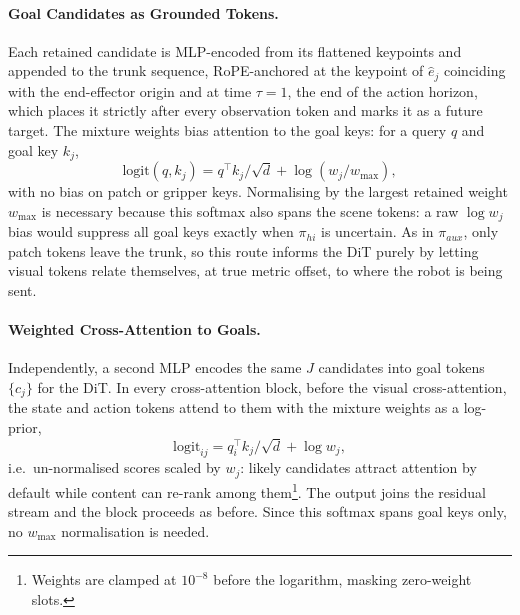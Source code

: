 \documentclass[letterpaper, 10 pt, conference]{ieeeconf}  %
\begin{document}
\paragraph{\textbf{Goal Candidates as Grounded Tokens.}}
Each retained candidate is MLP-encoded from its flattened keypoints and
appended to the trunk sequence, RoPE-anchored at the keypoint of $\hat{e}_j$
coinciding with the end-effector origin and at time $\tau=1$, the end of the
action horizon, which places it strictly after every observation token and
marks it as a future target. The mixture weights bias attention to the goal keys: for a
query $q$ and goal key $k_j$,
\begin{equation}
  \mathrm{logit}(q,k_j) = q^{\top}k_j/\sqrt{d} + \log(w_j/w_{\max}),
\end{equation}
with no bias on patch or gripper keys. Normalising by the largest retained
weight $w_{\max}$ is necessary because this softmax also spans the scene
tokens: a raw $\log w_j$ bias would suppress all goal keys exactly when
$\pi_{hi}$ is uncertain. As in $\pi_{aux}$, only patch tokens leave the trunk,
so this route informs the DiT purely by letting visual tokens relate
themselves, at true metric offset, to where the robot is being sent.

\paragraph{\textbf{Weighted Cross-Attention to Goals.}}
Independently, a second MLP encodes the same $J$ candidates into goal tokens
$\{c_j\}$ for the DiT. In every cross-attention block, before the visual
cross-attention, the state and action tokens attend to them with the mixture
weights as a log-prior,
\begin{equation}
  \mathrm{logit}_{ij} = q_i^{\top}k_j/\sqrt{d} + \log w_j,
\end{equation}
i.e.\ un-normalised scores scaled by $w_j$: likely candidates attract
attention by default while content can re-rank among
them\footnote{Weights are clamped at $10^{-8}$ before the logarithm, masking
zero-weight slots.}. The output joins the residual stream and the block
proceeds as before. Since this softmax spans goal keys only, no $w_{\max}$
normalisation is needed.
\end{document}
